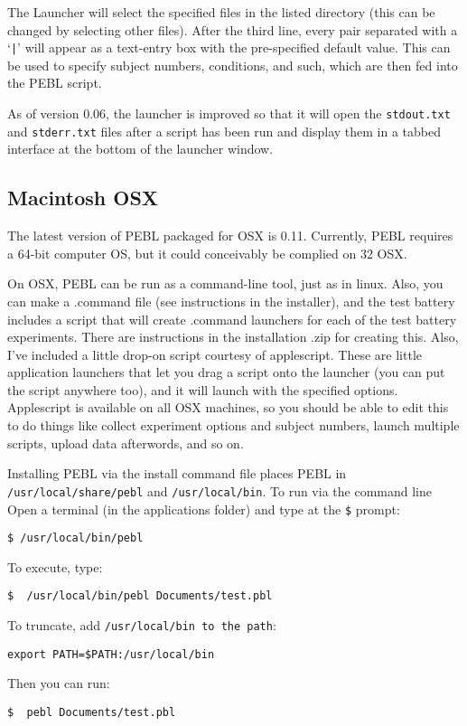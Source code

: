 The Launcher will select the specified files in the listed directory
(this can be changed by selecting other files).  After the third line,
every pair separated with a `\texttt{|}' will appear as a text-entry
box with the pre-specified default value. This can be used to specify
subject numbers, conditions, and such, which are then fed into the
PEBL script.

As of version 0.06, the launcher is improved so that it will open the
\verb+stdout.txt+ and \verb+stderr.txt+ files after a script has been run and
display them in a tabbed interface at the bottom of the launcher
window.

\subsection{ Macintosh OSX}

The latest version of PEBL packaged for OSX is 0.11. Currently, PEBL requires a 64-bit computer OS, but it could conceivably be complied on 32 OSX.

On OSX, PEBL can be run as a command-line tool, just as in linux.
Also, you can make a .command file (see instructions in the
installer), and the test battery includes a script that will create
.command launchers for each of the test battery experiments.  There
are instructions in the installation .zip for creating this.  Also, 
I've included a little drop-on
script courtesy of applescript.  These are little
application launchers that let you drag a script onto the launcher
(you can put the script anywhere too), and it will launch with the
specified options.  Applescript is available on all OSX machines, so
you should be able to edit this to do things like collect experiment
options and subject numbers, launch multiple scripts, upload data
afterwords, and so on.


Installing PEBL via the install command file places PEBL in\\
\texttt{/usr/local/share/pebl} and \texttt{/usr/local/bin}.
To run via the command line  Open a terminal (in the applications folder)
and type at the \texttt{\$} prompt:
\begin{verbatim}
$ /usr/local/bin/pebl
\end{verbatim}
To execute, type:
\begin{verbatim}
$  /usr/local/bin/pebl Documents/test.pbl
\end{verbatim}
To truncate, add \texttt{/usr/local/bin to the path}:
\begin{verbatim}
export PATH=$PATH:/usr/local/bin
\end{verbatim}
Then you can run:
\begin{verbatim}
$  pebl Documents/test.pbl
\end{verbatim}

